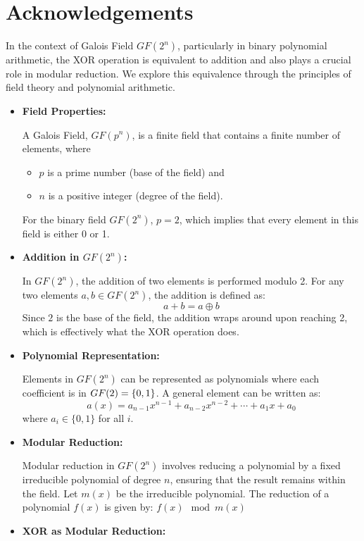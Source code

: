 \section*{Acknowledgements}

\begin{note}
	In the context of Galois Field \( GF(2^n) \), particularly in binary polynomial arithmetic, the XOR operation is equivalent to addition and also plays a crucial role in modular reduction. We explore this equivalence through the principles of field theory and polynomial arithmetic.
	\begin{itemize}
		\item \textbf{Field Properties:}
		
		A Galois Field, \( GF(p^n) \), is a finite field that contains a finite number of elements, where
		\begin{itemize}
			\item \( p \) is a prime number (base of the field) and
			\item \( n \) is a positive integer (degree of the field).
		\end{itemize}
		For the binary field \( GF(2^n) \), \( p = 2 \), which implies that every element in this field is either 0 or 1.
		\vspace{8pt}
		\item \textbf{Addition in \( GF(2^n) \):}
		
		In \( GF(2^n) \), the addition of two elements is performed modulo 2. For any two elements \( a, b \in GF(2^n) \), the addition is defined as:
		\[ a + b = a \oplus b\]
		Since \( 2 \) is the base of the field, the addition wraps around upon reaching 2, which is effectively what the XOR operation does.
		\vspace{8pt}
		\item \textbf{Polynomial Representation:}
		
		Elements in \( GF(2^n) \) can be represented as polynomials where each coefficient is in \( GF(2)=\set{0,1} \). A general element can be written as:
		\[ a(x) = a_{n-1}x^{n-1} + a_{n-2}x^{n-2} + \cdots + a_1x + a_0 \]
		where \( a_i \in \{0, 1\} \) for all \( i \).
		\vspace{8pt}
		\item \textbf{Modular Reduction:}
		
		Modular reduction in \( GF(2^n) \) involves reducing a polynomial by a fixed irreducible polynomial of degree \( n \), ensuring that the result remains within the field. Let \( m(x) \) be the irreducible polynomial. The reduction of a polynomial \( f(x) \) is given by:
		$ f(x) \mod m(x)$
		\vspace{8pt}
		\item \textbf{XOR as Modular Reduction:}
		

\end{itemize}
\end{note}
